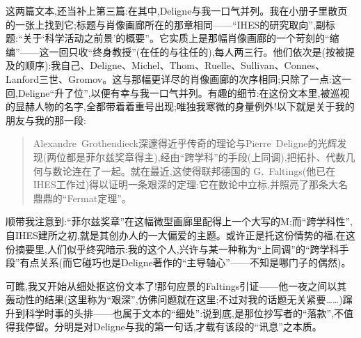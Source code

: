 这两篇文本,还当补上第三篇:在其中,Deligne与我一口气并列。我在小册子里散页的一张上找到它;标题与肖像画廊所在的那章相同——“IHES的研究取向”,副标题:“关于‘科学活动之前景’的概要”。它实质上是那幅肖像画廊的一个苛刻的“缩编”——这一回只收“终身教授”(在任的与往任的),每人两三行。他们依次是(按被提及的顺序):我自己、Deligne、Michel、Thom、Ruelle、Sullivan、Connes、Lanford三世、Gromov。这与那幅更详尽的肖像画廊的次序相同;只除了一点:这一回,Deligne“升了位”,以便有幸与我一口气并列。有趣的细节:在这份文本里,被巡视的显赫人物的名字,全都带着着重号出现;唯独我寒微的身量例外!以下就是关于我的朋友与我的那一段:

\begin{quote}
Alexandre~Grothendieck深邃得近乎传奇的理论与Pierre~Deligne的光辉发现(两位都是菲尔兹奖章得主),经由“跨学科”的手段(上同调),把拓扑、代数几何与数论连在了一起。就在最近,这使得联邦德国的 G.~Faltings(他已在IHES工作过)得以证明一条艰深的定理:它在数论中立标,并照亮了那条大名鼎鼎的“Fermat定理”。
\end{quote}

顺带我注意到:“菲尔兹奖章”在这幅微型画廊里配得上一个大写的M;而“跨学科性”,自IHES建所之初,就是其创办人的一大偏爱的主题。或许正是托这份情势的福,在这份摘要里,人们似乎终究暗示:我的这个人,兴许与某一种称为“上同调”的“跨学科手段”有点关系(而它碰巧也是Deligne著作的“主导轴心”——不知是哪门子的偶然)。

\dmark{}可瞧,我又开始从细处抠这份文本了!那句应景的Faltings引证——他一夜之间以其轰动性的结果(这里称为“艰深”,仿佛问题就在这里;不过对我的话题无关紧要……)蹿升到科学时事的头排——也属于文本的“细处”:说到底,是那位抄写者的“落款”,不值得我停留。分明是对Deligne与我的第一句话,才载有该段的“讯息”之本质。

